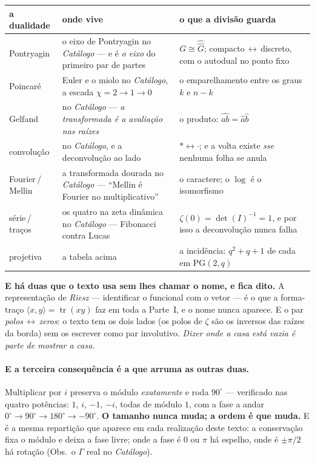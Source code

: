 \documentclass[livro.tex]{subfiles}
\begin{document}
\smallskip
\begin{center}\small
\begin{tabular}{@{}lp{}p{}@{}}
\hline
\textbf{a dualidade} & \textbf{onde vive} & \textbf{o que a divisão guarda} \\
\hline
Pontryagin & o eixo de Pontryagin no \emph{Catálogo} --- e é \emph{o eixo} do primeiro par de partes & $G\cong\widehat{\widehat G}$; compacto\,$\leftrightarrow$\,discreto, com o autodual no ponto fixo \\
Poincaré & Euler e o miolo no \emph{Catálogo}, a escada $\chi=2\to1\to0$ & o emparelhamento entre os graus $k$ e $n-k$ \\
Gelfand & no \emph{Catálogo} --- \emph{a transformada é a avaliação nas raízes} & o produto: $\widehat{ab}=\hat a\hat b$ \\
convolução & no \emph{Catálogo}, e a deconvolução ao lado & $\ast\leftrightarrow\cdot$; e a volta existe \emph{sse} nenhuma folha se anula \\
Fourier\,/\,Mellin & a transformada dourada no \emph{Catálogo} --- ``Mellin é Fourier no multiplicativo'' & o caractere; o $\log$ é o isomorfismo \\
série\,/\,traços & os quatro na zeta dinâmica no \emph{Catálogo} --- Fibonacci contra Lucas & $\zeta(0)=\det(I)^{-1}=1$, e por isso a deconvolução nunca falha \\
projetiva & a tabela acima & a incidência: $q^2+q+1$ de cada em $\mathrm{PG}(2,q)$ \\
\hline
\end{tabular}
\end{center}

\smallskip
\noindent \textbf{E há duas que o texto usa sem lhes chamar o nome, e fica dito.} A representação
de \emph{Riesz} --- identificar o funcional com o vetor --- é o que a forma-traço $\langle
x,y\rangle=\operatorname{tr}(xy)$ faz em toda a Parte~I, e o nome nunca aparece. E o par
\emph{polos\,$\leftrightarrow$\,zeros}: o texto tem os dois lados (os polos de $\zeta$ são os
inversos das raízes da borda) sem os escrever como par involutivo. \emph{Dizer onde a casa está
vazia é parte de mostrar a casa.}

\paragraph{E a terceira consequência é a que arruma as outras duas.} Multiplicar por $i$
preserva o módulo \emph{exatamente} e roda $90^\circ$ --- verificado nas quatro potências: $1$,
$i$, $-1$, $-i$, todas de módulo $1$, com a fase a andar $0^\circ \to 90^\circ \to 180^\circ \to
-90^\circ$. \textbf{O tamanho nunca muda; a ordem é que muda.} E é a mesma repartição que aparece
em cada realização deste texto: a conservação fixa o módulo e deixa a fase livre; onde a fase é $0$
ou $\pi$ há espelho, onde é $\pm\pi/2$ há rotação (Obs.~o $\Gamma$ real no \emph{Catálogo}).
\end{document}
